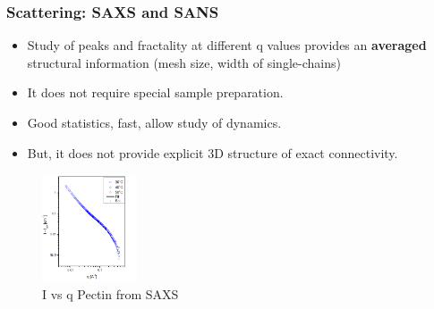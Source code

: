 \documentclass[10pt]{beamer}
\begin{document}
\begin{frame}
  \frametitle{Scattering: SAXS and SANS}
  \begin{itemize}
    \item Study of peaks and fractality at different q values provides an \textbf{averaged} structural information (mesh size, width of single-chains)
    \item It does not require special sample preparation.
    \item Good statistics, fast, allow study of dynamics.
    \item \alert{But}, it does not provide explicit 3D structure of exact connectivity.
  \end{itemize}
    \begin{figure}[htpb]
      \includegraphics[width=0.25\textwidth]{./Figures/saxs_pectin.png}
      \caption*{\footnotesize{I vs q Pectin from SAXS}}
    \end{figure}
\end{frame}
\end{document}
